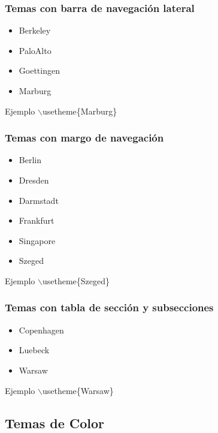 \documentclass[aspectratio=43]{beamer}%
\begin{document}
\begin{frame}[fragile]
\frametitle{\textbf{Temas con barra de navegación lateral}}
\justifying
 \begin{itemize}\justifying
  \item Berkeley
  \item PaloAlto
  \item Goettingen
  \item Marburg
\end{itemize}
\begin{block}{Ejemplo}
$\backslash$usetheme\{Marburg\}
\end{block}
\end{frame}

\begin{frame}[fragile]
\frametitle{\textbf{Temas con margo de navegación}}
\justifying
 \begin{itemize}\justifying
  \item Berlin
  \item Dresden
  \item Darmstadt
  \item  Frankfurt
  \item Singapore
  \item Szeged
\end{itemize}
\begin{block}{Ejemplo}
$\backslash$usetheme\{Szeged\}
\end{block}
\end{frame}

\begin{frame}[fragile]
\frametitle{\textbf{Temas con tabla de sección y subsecciones}}
\justifying
 \begin{itemize}\justifying
  \item Copenhagen
  \item Luebeck
  \item Warsaw
\end{itemize}

\begin{block}{Ejemplo}
$\backslash$usetheme\{Warsaw\}
\end{block}


\end{frame}

\subsection{Temas de Color}
\end{document}
